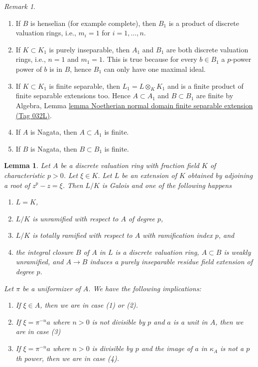 \documentclass{amsart}
\theoremstyle{plain}
\newtheorem{lemma}[subsection]{Lemma}
\theoremstyle{definition}
\theoremstyle{remark}
\newtheorem{remark}[subsection]{Remark}
\numberwithin{equation}{subsection}
\begin{document}
\begin{remark}
\begin{enumerate}
\item If $B$ is henselian (for example complete), then $B_1$
is a product of discrete valuation rings, i.e., $m_i = 1$ for
$i = 1, \ldots, n$.
\item If $K \subset K_1$ is purely inseparable, then $A_1$ and $B_1$
are both discrete valuation rings, i.e., $n = 1$ and $m_1 = 1$.
This is true because for every $b \in B_1$ a $p$-power power of $b$
is in $B$, hence $B_1$ can only have one maximal ideal.
\item If $K \subset K_1$ is finite separable, then $L_1 = L \otimes_K K_1$
and is a finite product of finite separable extensions too. Hence
$A \subset A_1$ and $B \subset B_1$ are finite by
Algebra, Lemma
\href{https://stacks.math.columbia.edu/tag/032L}{lemma Noetherian normal domain finite separable extension (Tag 032L)}.
\item If $A$ is Nagata, then $A \subset A_1$ is finite.
\item If $B$ is Nagata, then $B \subset B_1$ is finite.
\end{enumerate}
\end{remark}

\begin{lemma}
\label{lemma-pre-characteristic-p-case}
Let $A$ be a discrete valuation ring with fraction field $K$ of characteristic
$p > 0$. Let $\xi \in K$. Let $L$ be an extension of $K$ obtained by
adjoining a root of $z^p - z = \xi$. Then $L/K$ is Galois and one of the
following happens
\begin{enumerate}
\item $L = K$,
\item $L/K$ is unramified with respect to $A$ of degree $p$,
\item $L/K$ is totally ramified with respect to $A$
with ramification index $p$, and
\item the integral closure $B$ of $A$ in $L$ is a discrete valuation ring,
$A \subset B$ is weakly unramified, and $A \to B$ induces a purely inseparable
residue field extension of degree $p$.
\end{enumerate}
Let $\pi$ be a uniformizer of $A$. We have the following implications:
\begin{enumerate}
\item[(A)] If $\xi \in A$, then we are in case (1) or (2).
\item[(B)] If $\xi = \pi^{-n}a$ where $n > 0$ is not divisible by
$p$ and $a$ is a unit in $A$, then we are in case (3)
\item[(C)] If $\xi = \pi^{-n} a$ where $n > 0$ is divisible by $p$ and
the image of $a$ in $\kappa_A$ is not a $p$th power, then we are in case (4).
\end{enumerate}
\end{lemma}
\end{document}
